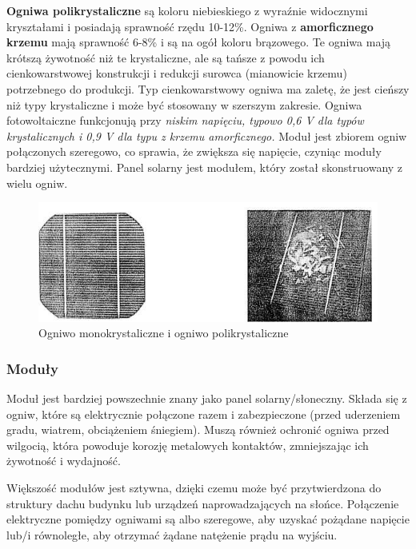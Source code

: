 \documentclass[12pt,a4paper]{article}
\begin{document}
\textbf{Ogniwa polikrystaliczne} są koloru niebieskiego z wyraźnie widocznymi 
kryształami i posiadają sprawność rzędu 10-12\%. Ogniwa z \textbf{amorficznego 
krzemu} mają sprawność 6-8\% i są na ogół koloru brązowego. Te ogniwa 
mają krótszą żywotność niż te krystaliczne, ale są tańsze z powodu ich 
cienkowarstwowej konstrukcji i redukcji surowca (mianowicie krzemu) 
potrzebnego do produkcji. Typ cienkowarstwowy ogniwa ma zaletę, że 
jest cieńszy niż typy krystaliczne i może być stosowany w szerszym 
zakresie. 
Ogniwa fotowoltaiczne funkcjonują przy \textit{niskim napięciu, typowo 0,6 V dla 
typów krystalicznych i 0,9 V dla typu z krzemu amorficznego.} Moduł jest 
zbiorem ogniw połączonych szeregowo, co sprawia, że zwiększa się 
napięcie, czyniąc moduły bardziej użytecznymi. Panel solarny jest 
modułem, który został skonstruowany z wielu ogniw. 

\begin{figure}[h]
\centering
\caption{Ogniwo monokrystaliczne i ogniwo polikrystaliczne}
\includegraphics[natwidth=14.65cm,natheight=5.17cm]{media/image5.jpg}
\end{figure}


\subsubsection{Moduły}
Moduł jest bardziej powszechnie znany jako panel 
solarny/słoneczny. Składa się z ogniw, które są elektrycznie połączone 
razem i zabezpieczone (przed uderzeniem gradu, wiatrem, obciążeniem 
śniegiem). Muszą również ochronić ogniwa przed wilgocią, która powoduje 
korozję metalowych kontaktów, zmniejszając ich żywotność i wydajność. 

Większość modułów jest sztywna, dzięki czemu może być przytwierdzona do 
struktury dachu budynku lub urządzeń naprowadzających na słońce. 
Połączenie elektryczne pomiędzy ogniwami są albo szeregowe, aby uzyskać 
pożądane napięcie lub/i równoległe, aby otrzymać żądane natężenie prądu 
na wyjściu. 
\end{document}
